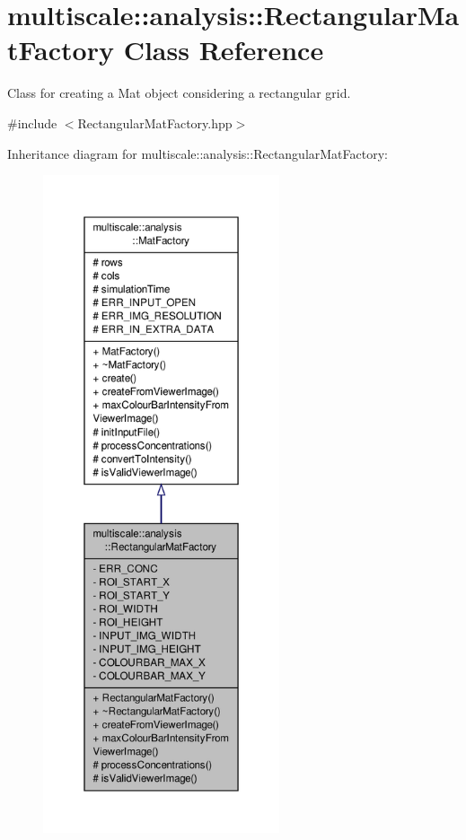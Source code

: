\hypertarget{classmultiscale_1_1analysis_1_1RectangularMatFactory}{\section{multiscale\-:\-:analysis\-:\-:Rectangular\-Mat\-Factory Class Reference}
\label{classmultiscale_1_1analysis_1_1RectangularMatFactory}
}


Class for creating a Mat object considering a rectangular grid.  




{\ttfamily \#include $<$Rectangular\-Mat\-Factory.\-hpp$>$}



Inheritance diagram for multiscale\-:\-:analysis\-:\-:Rectangular\-Mat\-Factory\-:
\nopagebreak
\begin{figure}[H]
\begin{center}
\leavevmode
\includegraphics[height=550pt]{classmultiscale_1_1analysis_1_1RectangularMatFactory__inherit__graph}
\end{center}
\end{figure}


